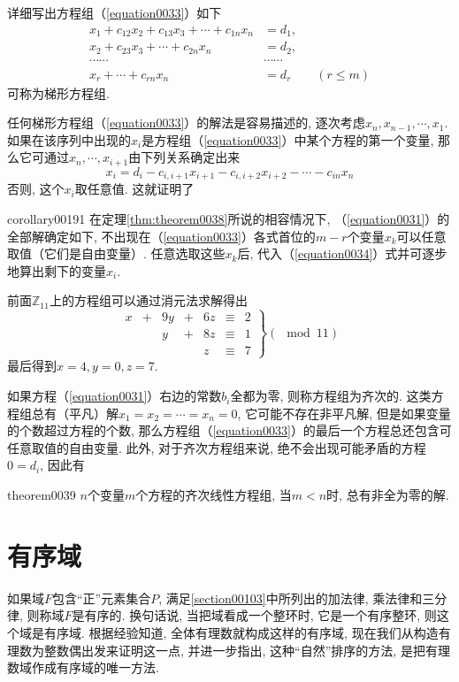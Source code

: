 详细写出方程组（\ref{equation0033}）如下
\begin{equation}\label{equation0034}
\begin{aligned}
x_1+c_{12}x_2+c_{13}x_3+\cdots+c_{1n}x_n&=d_1,\\
x_2+c_{23}x_3+\cdots+c_{2n}x_n&=d_2,\\
\cdots\cdots&\cdots\cdots\\
x_r+\cdots+c_{rn}x_n&=d_r\qquad(r \le m)
\end{aligned}
\end{equation}
可称为梯形方程组. 

任何梯形方程组（\ref{equation0033}）的解法是容易描述的, 逐次考虑$x_{n}, x_{n-1}, \cdots, x_1$. 如果在该序列中出现的$x_i$是方程组（\ref{equation0033}）中某个方程的第一个变量, 那么它可通过$x_n,\cdots, x_{i+1}$由下列关系确定出来
\[
x_i = d_i - c_{i,i+1}x_{i+1}-c_{i,i+2}x_{i+2}-\cdots-c_{in}x_n
\]
否则, 这个$x_i$取任意值. 这就证明了
\begin{corollary}{}{corollary00191}
在定理\ref{thm:theorem0038}所说的相容情况下, （\ref{equation0031}）的全部解确定如下, 不出现在（\ref{equation0033}）各式首位的$m-r$个变量$x_k$可以任意取值（它们是自由变量）. 任意选取这些$x_k$后, 代入（\ref{equation0034}）式并可逐步地算出剩下的变量$x_i$. 
\end{corollary}

前面$\mathbb{Z}_11$上的方程组可以通过消元法求解得出
\[
\left.
\begin{array}{rcrcrcl}
x&+&9y&+&6z&\equiv&2\\
&&y&+&8z&\equiv&1\\
&&&&z&\equiv&7
\end{array}
\right\}(\mod{11})
\]
最后得到$x=4,y=0,z=7$. 


如果方程（\ref{equation0031}）右边的常数$b_i$全都为零, 则称方程组为齐次的. 这类方程组总有（平凡）解$x_1=x_2=\cdots=x_n=0$, 它可能不存在非平凡解, 但是如果变量的个数超过方程的个数, 那么方程组（\ref{equation0033}）的最后一个方程总还包含可任意取值的自由变量. 此外, 对于齐次方程组来说, 绝不会出现可能矛盾的方程$0=d_i$, 因此有
\begin{theorem}{}{theorem0039}
$n$个变量$m$个方程的齐次线性方程组, 当$m < n$时, 总有非全为零的解. 
\end{theorem}

\section{有序域}
如果域$F$包含“正”元素集合$P$, 满足\ref{section00103}中所列出的加法律, 乘法律和三分律, 则称域$F$是有序的. 换句话说, 当把域看成一个整环时, 它是一个有序整环, 则这个域是有序域. 根据经验知道, 全体有理数就构成这样的有序域, 现在我们从构造有理数为整数偶出发来证明这一点, 并进一步指出, 这种“自然”排序的方法, 是把有理数域作成有序域的唯一方法. 


